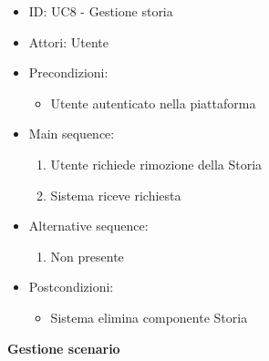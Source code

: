 \documentclass{article}
\begin{document}
\begin{itemize}[label = { }]
    \itemsep0px
    \item ID: UC8 - Gestione storia
    \item Attori: Utente
    \item Precondizioni: 
        \begin{itemize}[label = {-}]
            \item Utente autenticato nella piattaforma
        \end{itemize}
    \item Main sequence: 
        \begin{enumerate}
            \item Utente richiede rimozione della Storia
            \item Sistema riceve richiesta
        \end{enumerate}
    \item Alternative sequence:
        \begin{enumerate}
            \item Non presente
        \end{enumerate}
    \item Postcondizioni: 
        \begin{itemize}[label = {-}]
            \item Sistema elimina componente Storia
        \end{itemize}
\end{itemize}
\textbf{Gestione scenario}
\end{document}
